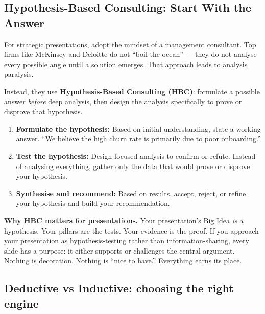 \subsection{Hypothesis-Based Consulting: Start With the Answer}

For strategic presentations, adopt the mindset of a management consultant. Top firms like McKinsey and Deloitte do not ``boil the ocean'' --- they do not analyse every possible angle until a solution emerges. That approach leads to analysis paralysis.

Instead, they use \textbf{Hypothesis-Based Consulting (HBC)}: formulate a possible answer \emph{before} deep analysis, then design the analysis specifically to prove or disprove that hypothesis.

\begin{enumerate}
  \item \textbf{Formulate the hypothesis:} Based on initial understanding, state a working answer. ``We believe the high churn rate is primarily due to poor onboarding.''
  \item \textbf{Test the hypothesis:} Design focused analysis to confirm or refute. Instead of analysing everything, gather only the data that would prove or disprove your hypothesis.
  \item \textbf{Synthesise and recommend:} Based on results, accept, reject, or refine your hypothesis and build your recommendation.
\end{enumerate}

\begin{diagnosisbox}
\textbf{Why HBC matters for presentations.} Your presentation's Big Idea \emph{is} a hypothesis. Your pillars are the tests. Your evidence is the proof. If you approach your presentation as hypothesis-testing rather than information-sharing, every slide has a purpose: it either supports or challenges the central argument. Nothing is decoration. Nothing is ``nice to have.'' Everything earns its place.
\end{diagnosisbox}


\subsection{Deductive vs Inductive: choosing the right engine}

